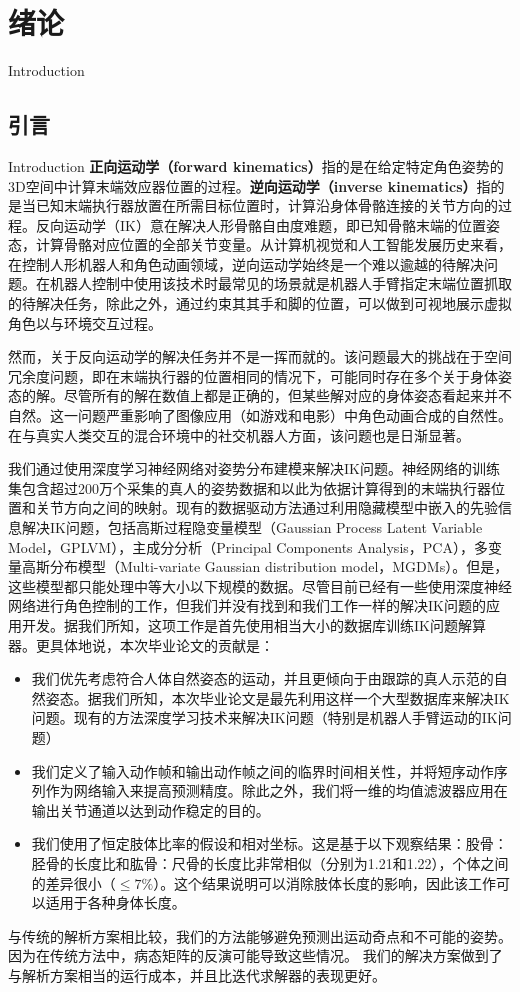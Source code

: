 \chapter{绪论}{Introduction}

\section{引言}{Introduction}
\textbf{正向运动学（forward kinematics）}指的是在给定特定角色姿势的3D空间中计算末端效应器位置的过程。\textbf{逆向运动学（inverse kinematics）}指的是当已知末端执行器放置在所需目标位置时，计算沿身体骨骼连接的关节方向的过程。反向运动学（IK）意在解决人形骨骼自由度难题，即已知骨骼末端的位置姿态，计算骨骼对应位置的全部关节变量。从计算机视觉和人工智能发展历史来看，在控制人形机器人和角色动画领域，逆向运动学始终是一个难以逾越的待解决问题。在机器人控制中使用该技术时最常见的场景就是机器人手臂指定末端位置抓取的待解决任务，除此之外，通过约束其其手和脚的位置，可以做到可视地展示虚拟角色以与环境交互过程。

然而，关于反向运动学的解决任务并不是一挥而就的。该问题最大的挑战在于空间冗余度\cite{reinhart2011neural}问题，即在末端执行器的位置相同的情况下，可能同时存在多个关于身体姿态的解。尽管所有的解在数值上都是正确的，但某些解对应的身体姿态看起来并不自然。这一问题严重影响了图像应用（如游戏和电影）中角色动画合成的自然性。在与真实人类交互的混合环境中的社交机器人方面，该问题也是日渐显著。

我们通过使用深度学习神经网络对姿势分布建模来解决IK问题。神经网络的训练集包含超过200万个采集的真人的姿势数据和以此为依据计算得到的末端执行器位置和关节方向之间的映射。现有的数据驱动方法通过利用隐藏模型中嵌入的先验信息解决IK问题，包括高斯过程隐变量模型（Gaussian Process Latent Variable Model，GPLVM）\cite{grochow2004Style}，主成分分析（Principal Components Analysis，PCA）\cite{tournier2009motion}，多变量高斯分布模型（Multi-variate Gaussian distribution model，MGDMs）\cite{huang2017multi}。但是，这些模型都只能处理中等大小以下规模的数据\cite{koker2004study,daya2010applying,feng2012inverse}。尽管目前已经有一些使用深度神经网络进行角色控制的工作\cite{levine2014learning,holden2016deep,holden2017phase}，但我们并没有找到和我们工作一样的解决IK问题的应用开发。据我们所知，这项工作是首先使用相当大小的数据库训练IK问题解算器。更具体地说，本次毕业论文的贡献是：
\begin{itemize}
\item 我们优先考虑符合人体自然姿态的运动，并且更倾向于由跟踪的真人示范的自然姿态。据我们所知，本次毕业论文是最先利用这样一个大型数据库来解决IK问题。现有的方法深度学习技术来解决IK问题（特别是机器人手臂运动的IK问题）
\item 我们定义了输入动作帧和输出动作帧之间的临界时间相关性，并将短序动作序列作为网络输入来提高预测精度。除此之外，我们将一维的均值滤波器应用在输出关节通道以达到动作稳定的目的。
\item 我们使用了恒定肢体比率的假设和相对坐标。这是基于以下观察结果：股骨：胫骨的长度比和肱骨：尺骨的长度比非常相似（分别为1.21和1.22），个体之间的差异很小（$\le7\%$）\cite{pietak2013fundamental}。这个结果说明可以消除肢体长度的影响，因此该工作可以适用于各种身体长度。
\end{itemize}

与传统的解析方案相比较，我们的方法能够避免预测出运动奇点和不可能的姿势。因为在传统方法中，病态矩阵的反演可能导致这些情况。 我们的解决方案做到了与解析方案相当的运行成本，并且比迭代求解器的表现更好。
